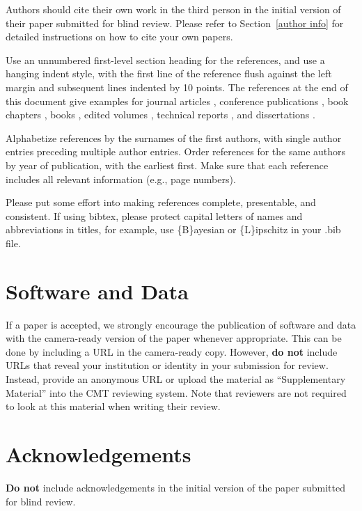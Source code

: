 Authors should cite their own work in the third person
in the initial version of their paper submitted for blind review.
Please refer to Section~\ref{author info} for detailed instructions on how to
cite your own papers.

Use an unnumbered first-level section heading for the references, and use a
hanging indent style, with the first line of the reference flush against the
left margin and subsequent lines indented by 10 points. The references at the
end of this document give examples for journal articles \cite{Samuel59},
conference publications \cite{langley00}, book chapters \cite{Newell81}, books
\cite{DudaHart2nd}, edited volumes \cite{MachineLearningI}, technical reports
\cite{mitchell80}, and dissertations \cite{kearns89}.

Alphabetize references by the surnames of the first authors, with
single author entries preceding multiple author entries. Order
references for the same authors by year of publication, with the
earliest first. Make sure that each reference includes all relevant
information (e.g., page numbers).

Please put some effort into making references complete, presentable, and
consistent. If using bibtex, please protect capital letters of names and
abbreviations in titles, for example, use \{B\}ayesian or \{L\}ipschitz
in your .bib file.

\section*{Software and Data}

If a paper is accepted, we strongly encourage the publication of software and data with the
camera-ready version of the paper whenever appropriate. This can be
done by including a URL in the camera-ready copy. However, \textbf{do not}
include URLs that reveal your institution or identity in your
submission for review. Instead, provide an anonymous URL or upload
the material as ``Supplementary Material'' into the CMT reviewing
system. Note that reviewers are not required to look at this material
when writing their review.

\section*{Acknowledgements}

\textbf{Do not} include acknowledgements in the initial version of
the paper submitted for blind review.

